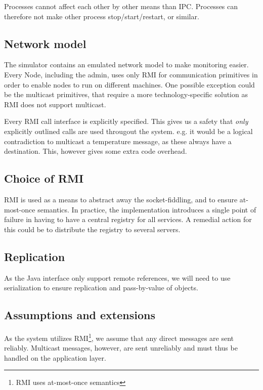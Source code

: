 \documentclass[10pt,a4paper]{article}
\begin{document}
Processes cannot affect each other by other means than IPC. Processes can therefore not make other process stop/start/restart, or similar.

\subsection{Network model}
The simulator contains an emulated network model to make monitoring easier. Every Node, including the admin, uses only RMI for communication primitives in order to enable nodes to run on different machines.
One possible exception could be the multicast primitives, that require a more technology-specific solution as RMI does not support multicast.

Every RMI call interface is explicitly specified. This gives us a safety that \emph{only} explicitly outlined calls are used througout the system. e.g. it would be a logical contradiction to multicast a temperature message, as these always have a destination. This, however gives some extra code overhead.

\subsection{Choice of RMI}
RMI is used as a means to abstract away the socket-fiddling, and to ensure at-most-once semantics. In practice, the implementation introduces a single point of failure in having to have a central registry for all services. A remedial action for this could be to distribute the registry to several servers.

\subsection{Replication}
As the Java interface  only support remote references, we will need to use serialization to ensure replication and pass-by-value of objects.

\subsection{Assumptions and extensions}
As the system utilizes RMI\footnote{RMI uses at-most-once semantics}, we assume that any direct messages are sent reliably. Multicast messages, however, are sent unreliably and must thus be handled on the application layer.\\
\end{document}
